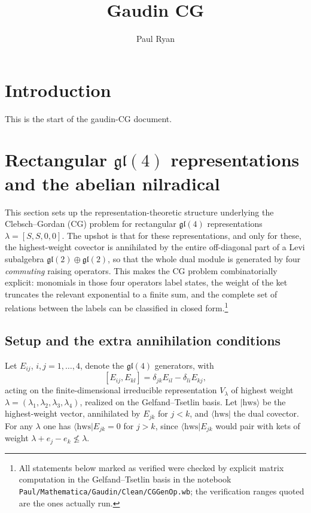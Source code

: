 \documentclass[12pt]{article}
\title{Gaudin CG}
\author{Paul Ryan}
\newcommand{\hws}{\mathrm{hws}}
\newcommand{\gl}{\mathfrak{gl}}
\begin{document}
\maketitle

\section{Introduction}

This is the start of the gaudin-CG document.

\section{Rectangular $\gl(4)$ representations and the abelian nilradical}
\label{sec:rect-nilradical}

This section sets up the representation-theoretic structure underlying the
Clebsch--Gordan (CG) problem for rectangular $\gl(4)$ representations
$\lambda=[S,S,0,0]$. The upshot is that for these representations, and only for
these, the highest-weight covector is annihilated by the entire off-diagonal part
of a Levi subalgebra $\gl(2)\oplus\gl(2)$, so that the whole dual module is
generated by four \emph{commuting} raising operators. This makes the CG problem
combinatorially explicit: monomials in those four operators label states, the
weight of the ket truncates the relevant exponential to a finite sum, and the
complete set of relations between the labels can be classified in closed
form.\footnote{All statements below marked as verified were checked by explicit
matrix computation in the Gelfand--Tsetlin basis in the notebook
\texttt{Paul/Mathematica/Gaudin/Clean/CGGenOp.wb}; the verification ranges quoted
are the ones actually run.}

\subsection{Setup and the extra annihilation conditions}

Let $E_{ij}$, $i,j=1,\dots,4$, denote the $\gl(4)$ generators, with
\[
[E_{ij},E_{kl}] = \delta_{jk}E_{il}-\delta_{li}E_{kj},
\]
acting on the finite-dimensional irreducible representation $V_\lambda$ of
highest weight $\lambda=(\lambda_1,\lambda_2,\lambda_3,\lambda_4)$, realized on
the Gelfand--Tsetlin basis. Let $|\hws\rangle$ be the highest-weight vector,
annihilated by $E_{jk}$ for $j<k$, and $\langle\hws|$ the dual covector. For any
$\lambda$ one has $\langle\hws|E_{jk}=0$ for $j>k$, since $\langle\hws|E_{jk}$
would pair with kets of weight $\lambda+e_j-e_k \not\leq \lambda$.
\end{document}
